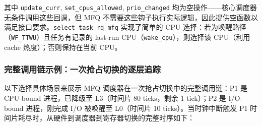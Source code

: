 \documentclass[a4paper]{article}
\begin{document}
其中 \texttt{update\_curr}, \texttt{set\_cpus\_allowed}, \texttt{prio\_changed} 均为空操作——核心调度器无条件调用这些回调，但 MFQ 不需要这些钩子执行实际逻辑，因此提供空函数以满足接口要求。\texttt{select\_task\_rq\_mfq} 实现了简单的 CPU 选择：若为唤醒路径（\texttt{WF\_TTWU}）且任务有记录的 last-run CPU（\texttt{wake\_cpu}），则选择该 CPU（利用 cache 热度）；否则保持在当前 CPU。

\subsubsection{完整调用链示例：一次抢占切换的逐层追踪}

以下选择具体场景来展示 MFQ 调度器在一次抢占切换中的完整调用链：P1 是 CPU-bound 进程，已降级至 L3（时间片 80 ticks，剩余 1 tick）；P2 是 I/O-bound 进程，刚完成 I/O 被唤醒至 L0（时间片 10 ticks）。当时钟中断触发 P1 时间片耗尽时，从硬件到调度器到寄存器切换的完整时序如下：
\end{document}
